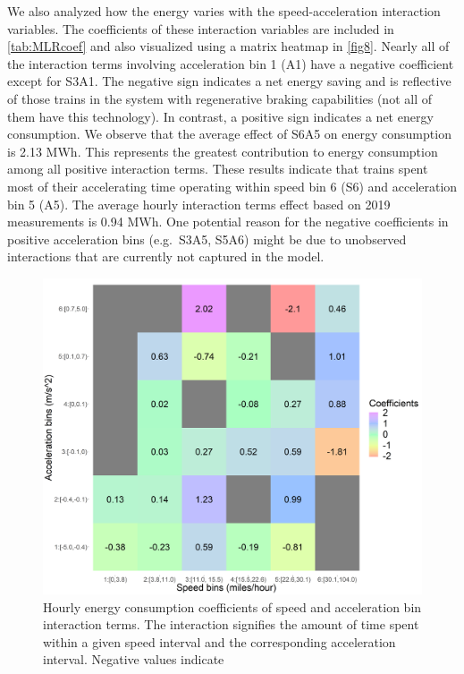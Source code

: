 \documentclass[times]{TRR}
\begin{document}
We also analyzed how the energy varies with the speed-acceleration interaction variables. The coefficients of these interaction variables are included in \autoref{tab:MLRcoef} and also visualized using a matrix heatmap in \autoref{fig8}. Nearly all of the interaction terms involving acceleration bin 1 (A1) have a negative coefficient except for S3A1. 
The negative sign indicates a net energy saving and is reflective of those trains in the system with regenerative braking capabilities (not all of them have this technology). In contrast, a positive sign indicates a net energy consumption. We observe that the average effect of S6A5 on energy consumption is 2.13 MWh. This represents the greatest contribution to energy consumption among all positive interaction terms. These results indicate that trains spent most of their accelerating time operating within speed bin 6 (S6) and acceleration bin 5 (A5). The average hourly interaction terms effect based on 2019 measurements is 0.94 MWh.
One potential reason for the negative coefficients in positive acceleration bins (e.g.\ S3A5, S5A6) might be due to unobserved interactions that are currently not captured in the model.

\begin{figure}[h!]
    \centering
    \includegraphics[scale=0.3]{Figure_8_interaction_terms_coef.png}
    \caption{Hourly energy consumption coefficients of speed and acceleration bin interaction terms. The interaction signifies the amount of time spent within a given speed interval and the corresponding acceleration interval. Negative values indicate }
    \label{fig8}
\end{figure}
\end{document}
